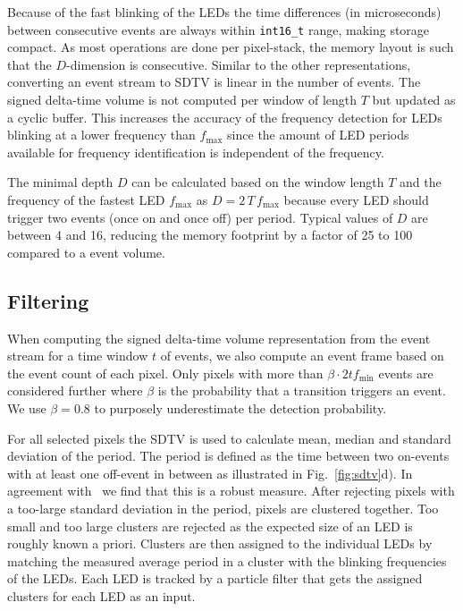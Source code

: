 Because of the fast blinking of the LEDs the time differences (in microseconds) between consecutive events are always within \texttt{int16\_t} range, making storage compact. As most operations are done per pixel-stack, the memory layout is such that the $D$-dimension is consecutive. Similar to the other representations, converting an event stream to SDTV is linear in the number of events.
The signed delta-time volume is not computed per window of length $T$ but updated as a cyclic buffer. This increases the accuracy of the frequency detection for LEDs blinking at a lower frequency than $f_\text{max}$ since the amount of LED periods available for frequency identification is independent of the frequency.

The minimal depth $D$ can be calculated based on the window length $T$ and the frequency of the fastest LED $f_\text{max}$ as $D = 2\,T\,f_\text{max}$ because every LED should trigger two events (once on and once off) per period. Typical values of $D$ are between 4 and 16, reducing the memory footprint by a factor of 25 to 100 compared to a event volume.


\subsection{Filtering}
When computing the signed delta-time volume representation from the event stream for a time window $t$ of events, we also compute an event frame based on the event count of each pixel. Only pixels with more than {$\beta \cdot 2 t f_\text{min}$} events are considered further where $\beta$ is the probability that a transition triggers an event. We use {$\beta = 0.8$} to purposely underestimate the detection probability.

For all selected pixels the SDTV is used to calculate mean, median and standard deviation of the period. The period is defined as the time between two on-events with at least one off-event in between as illustrated in Fig.~\ref{fig:sdtv}d). In agreement with~\cite{censi2013activeled} we find that this is a robust measure. After rejecting pixels with a too-large standard deviation in the period, pixels are clustered together. Too small and too large clusters are rejected as the expected size of an LED is roughly known a priori. Clusters are then assigned to the individual LEDs by matching the measured average period in a cluster with the blinking frequencies of the LEDs. Each LED is tracked by a particle filter that gets the assigned clusters for each LED as an input.

